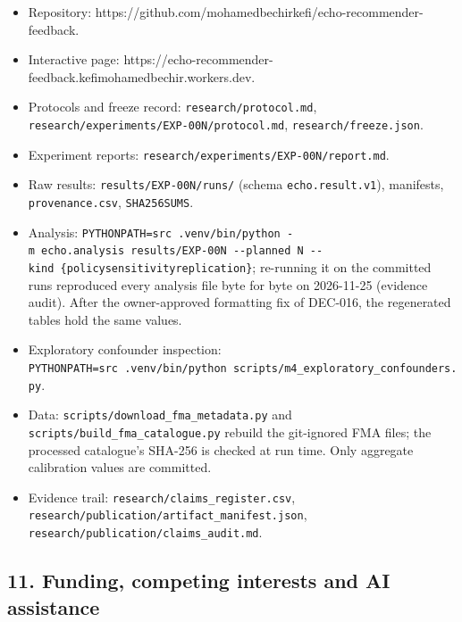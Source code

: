 \documentclass[
]{article}
\providecommand{\tightlist}{%
  \setlength{\itemsep}{0pt}\setlength{\parskip}{0pt}}
\begin{document}
\begin{itemize}
\tightlist
\item
  Repository:
  https://github.com/mohamedbechirkefi/echo-recommender-feedback.
\item
  Interactive page:
  https://echo-recommender-feedback.kefimohamedbechir.workers.dev.
\item
  Protocols and freeze record: \texttt{research/protocol.md},
  \texttt{research/experiments/EXP-00N/protocol.md},
  \texttt{research/freeze.json}.
\item
  Experiment reports: \texttt{research/experiments/EXP-00N/report.md}.
\item
  Raw results: \texttt{results/EXP-00N/runs/} (schema
  \texttt{echo.result.v1}), manifests, \texttt{provenance.csv},
  \texttt{SHA256SUMS}.
\item
  Analysis:
  \texttt{PYTHONPATH=src\ .venv/bin/python\ -m\ echo.analysis\ results/EXP-00N\ -\/-planned\ N\ -\/-kind\ \{policy\textbar{}sensitivity\textbar{}replication\}};
  re-running it on the committed runs reproduced every analysis file
  byte for byte on 2026-11-25 (evidence audit). After the owner-approved
  formatting fix of DEC-016, the regenerated tables hold the same
  values.
\item
  Exploratory confounder inspection:
  \texttt{PYTHONPATH=src\ .venv/bin/python\ scripts/m4\_exploratory\_confounders.py}.
\item
  Data: \texttt{scripts/download\_fma\_metadata.py} and
  \texttt{scripts/build\_fma\_catalogue.py} rebuild the git-ignored FMA
  files; the processed catalogue's SHA-256 is checked at run time. Only
  aggregate calibration values are committed.
\item
  Evidence trail: \texttt{research/claims\_register.csv},
  \texttt{research/publication/artifact\_manifest.json},
  \texttt{research/publication/claims\_audit.md}.
\end{itemize}

\subsection{11. Funding, competing interests and AI
assistance}\label{funding-competing-interests-and-ai-assistance}
\end{document}

